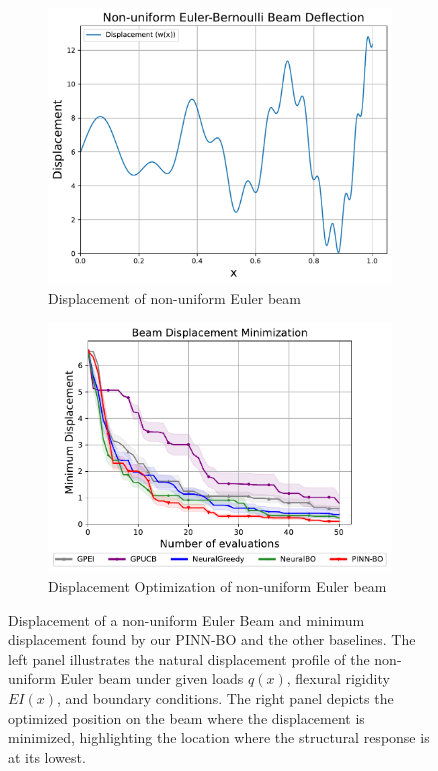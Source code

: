 \begin{figure}[!t]
    \centering
    \begin{subfigure}[t]{0.44\textwidth}
        \centering
    \includegraphics[width=\textwidth]{Figures/PINN-BO/beam.pdf}
    \caption{Displacement of non-uniform Euler beam}
     \label{fig:beam_illustration}
    \end{subfigure}
    \hfill
    \begin{subfigure}[t]{0.49\textwidth}
        \centering
        \includegraphics[width=1\textwidth]{Figures/PINN-BO/BeamDeflection_dim_1.pdf}
        \caption{Displacement Optimization of non-uniform Euler beam}
        \label{fig:beam_opt}
    \end{subfigure}
    \caption{Displacement of a non-uniform Euler Beam and minimum displacement found by our PINN-BO and the other baselines. The left panel illustrates the natural displacement profile of the non-uniform Euler beam under given loads $q(x)$,  flexural rigidity $EI(x)$, and boundary conditions. The right panel depicts the optimized position on the beam where the displacement is minimized, highlighting the location where the structural response is at its lowest.}
    \label{fig:beam}
\end{figure}



